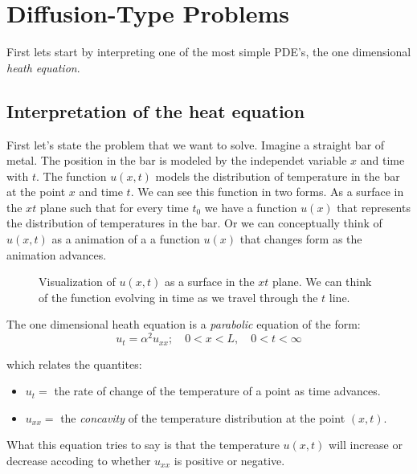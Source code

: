 \documentclass[../pde.tex]{subfiles}
\begin{document}
    \chapter{\sffamily Diffusion-Type Problems}
    First lets start by interpreting one of the most simple PDE's, the one dimensional \emph{heath equation}.
    \section{\sffamily Interpretation of the heat equation}
    First let's state the problem that we want to solve. Imagine a straight bar of metal. The position in the bar is modeled by
    the independet variable $x$ and time with $t$. The function $u(x,t)$ models the distribution of temperature in the bar at the
    point $x$ and time $t$. We can see this function in two forms. As a surface in the $xt$ plane such that for every time $t_0$ 
    we have a function $u(x)$ that represents the distribution of temperatures in the bar. Or we can conceptually think of
    $u(x,t)$ as a animation of a a function $u(x)$ that changes form as the animation advances.

    \begin{figure}[ht]
        \centering
        \caption{Visualization of $u(x,t)$ as a surface in the $xt$ plane. We can think of the function evolving in time as we
        travel through the $t$ line.}
        \label{fig:xt-heath}
    \end{figure}

    The one dimensional heath equation is a \emph{parabolic} equation of the form:
    \begin{equation*}
        u_{t}=\alpha^2 u_{xx}; \quad 0<x<L,\quad  0<t<\infty 
    \end{equation*}
    
    which relates the quantites:
    \begin{itemize}
        \item $u_{t} = $ the rate of change of the temperature of a point as time advances.
        \item $u_{xx} = $ the \emph{concavity} of the temperature distribution at the point $(x,t)$. 
    \end{itemize}
    
    What this equation tries to say is that the temperature $u(x,t)$ will increase or decrease accoding to whether $u_{xx}$ 
    is positive or negative.
\end{document}

